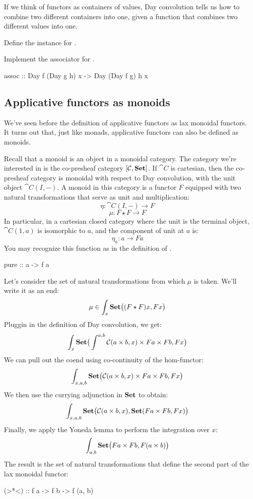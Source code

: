 \documentclass[DaoFP]{subfiles}
\begin{document}
If we think of functors as containers of values, Day convolution tells us how to combine two different containers into one, given a function that combines two different values into one. 

\begin{exercise}
Define the  instance for .
\end{exercise}

\begin{exercise}
Implement the associator for .
\begin{haskell}
assoc :: Day f (Day g h) x -> Day (Day f g) h x
\end{haskell}
\end{exercise}


\subsection{Applicative functors as monoids}
 
 We've seen before the definition of applicative functors as lax monoidal functors. It turns out that, just like monads, applicative functors can also be defined as monoids. 
 
Recall that a monoid is an object in a monoidal category. The category we're interested in is the co-presheaf category $[\mathcal{C}, \mathbf{Set}]$. If $\cat C$ is cartesian, then the co-presheaf category is monoidal with respect to Day convolution, with the unit object $\cat C(I, -)$. A monoid in this category is a functor $F$ equipped with two natural transformations that serve as unit and multiplication:
\[ \eta \colon \cat C(I, -) \to F \]
\[ \mu \colon F \star F \to F \]
In particular, in a cartesian closed category where the unit is the terminal object, $\cat C(1, a)$ is isomorphic to $a$, and the component of unit at $a$ is:
\[ \eta_a \colon a \to F a \] 
You may recognize this function as  in the definition of .
\begin{haskell}
pure :: a -> f a
\end{haskell}

Let's consider the set of natural transformations from which $\mu$ is taken. We'll write it as an end:
\[ \mu \in \int_x \mathbf{Set} \big( (F \star F) x, F x \big) \]
Pluggin in the definition of Day convolution, we get:
\[ \int_x \mathbf{Set} \big( \int^{a, b} \mathcal{C} (a \times b, x) \times F a \times  F b, F x \big) \]
We can pull out the coend using co-continuity of the hom-functor:
\[ \int_{x, a, b} \mathbf{Set} \big( \mathcal{C} (a \times b, x) \times F a \times  F b, F x \big) \]
We then use the currying adjunction in $\mathbf{Set}$ to obtain:
\[ \int_{x, a, b} \mathbf{Set} \big( \mathcal{C} (a \times b, x),  \mathbf{Set}( F a \times  F b, F x) \big) \]
Finally, we apply the Yoneda lemma to perform the integration over $x$:
\[ \int_{a, b}  \mathbf{Set} \big( F a \times  F b, F (a \times b) \big) \]
The result is the set of natural transformations that define the second part of the lax monoidal functor:
\begin{haskell}
  (>*<) :: f a -> f b -> f (a, b)
\end{haskell}
\end{document}
